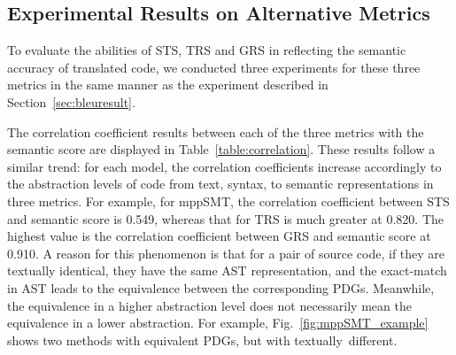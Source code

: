 \subsection{Experimental Results on Alternative Metrics}


To evaluate the abilities of STS, TRS and GRS in reflecting the
semantic accuracy of translated code, we conducted three experiments
for these three metrics in the same manner as the experiment described in
Section~\ref{sec:bleuresult}.

The correlation coefficient results between each of the three metrics
with the semantic score are displayed in
Table~\ref{table:correlation}. These results follow a similar trend:
for each model, the correlation coefficients increase 
accordingly to the abstraction levels of code from text, syntax, to semantic
representations in three metrics. For example, for mppSMT, the correlation
coefficient between STS and semantic score is 0.549, whereas that
for TRS is much greater at 0.820. The highest value is the
correlation coefficient between GRS and semantic score at 0.910. A
reason for this phenomenon is that for a pair of source code, if they
are textually identical, they have the same AST representation, and
the exact-match in AST leads to the equivalence between the
corresponding PDGs. Meanwhile, the equivalence in a higher
abstraction level does not necessarily mean the equivalence in a
lower abstraction. For example, Fig.~\ref{fig:mppSMT_example} shows
two methods with equivalent PDGs, but with textually~different. 


